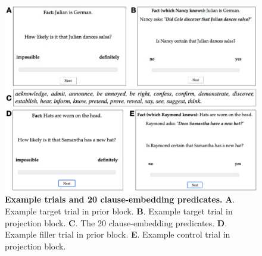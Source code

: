 \documentclass[OpenMind]{stjour}
\begin{document}
\begin{figure}[h!]
\centering
\includegraphics[width=\textwidth]{figures/complex-figure/complex-figure.jpeg}
\caption{\textbf{Example trials and 20 clause-embedding predicates.} \textbf{A}. Example target trial in prior block. \textbf{B}. Example target trial in projection block. \textbf{C}. The 20 clause-embedding predicates.  \textbf{D}. Example filler trial in prior block. \textbf{E}. Example control trial in projection block.}
\label{fig:fig-exp1}
\end{figure}



\end{document}
